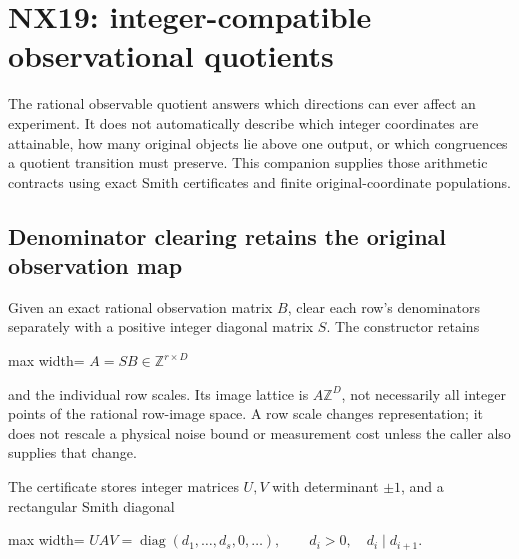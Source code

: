 \documentclass[
  11pt,
  a4paper,
]{report}
\begin{document}
\hypertarget{nx19-integer-compatible-observational-quotients}{%
\chapter{NX19: integer-compatible observational
quotients}\label{nx19-integer-compatible-observational-quotients}}

The rational observable quotient answers which directions can ever
affect an experiment. It does not automatically describe which integer
coordinates are attainable, how many original objects lie above one
output, or which congruences a quotient transition must preserve. This
companion supplies those arithmetic contracts using exact Smith
certificates and finite original-coordinate populations.

\hypertarget{denominator-clearing-retains-the-original-observation-map}{%
\section{Denominator clearing retains the original observation
map}\label{denominator-clearing-retains-the-original-observation-map}}

Given an exact rational observation matrix \(B\), clear each row's
denominators separately with a positive integer diagonal matrix \(S\).
The constructor retains

\begin{center}
\begin{adjustbox}{max width=\linewidth}
$\displaystyle
 A=SB\in\mathbb Z^{r\times D}
$
\end{adjustbox}
\end{center}

and the individual row scales. Its image lattice is \(A\mathbb Z^D\),
not necessarily all integer points of the rational row-image space. A
row scale changes representation; it does not rescale a physical noise
bound or measurement cost unless the caller also supplies that change.

The certificate stores integer matrices \(U,V\) with determinant
\(\pm1\), and a rectangular Smith diagonal

\begin{center}
\begin{adjustbox}{max width=\linewidth}
$\displaystyle
 UAV=\operatorname{diag}(d_1,\ldots,d_s,0,\ldots),\qquad
 d_i>0,\quad d_i\mid d_{i+1}.
$
\end{adjustbox}
\end{center}
\end{document}
